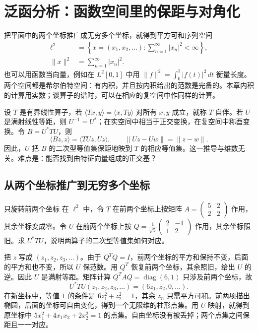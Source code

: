 \chapter{泛函分析：函数空间里的保距与对角化}
\label{chap:functional}

把平面中的两个坐标推广成无穷多个坐标，就得到平方可和序列空间
\begin{align*}
 \ell^2&=\left\{x=(x_1,x_2,\ldots):\sum_{n=1}^{\infty}|x_n|^2<\infty\right\},\\
 \|x\|^2&=\sum_{n=1}^{\infty}|x_n|^2.
\end{align*}
也可以用函数当向量，例如在 \(L^2[0,1]\) 中用 \(\|f\|^2=\int_0^1|f(t)|^2\,dt\) 衡量长度。两个空间都是希尔伯特空间：有内积，并且按内积给出的范数是完备的。本章内积的计算用实数；谈算子的谱时，可以在相应的复空间中作同样的计算。

设 \(T\) 是有界线性算子，若 \(\langle Tx,y\rangle=\langle x,Ty\rangle\) 对所有 \(x,y\) 成立，就称 \(T\) 自伴。若 \(U\) 是满射线性等距，则 \(U^{-1}=U^*\)；在实空间中相当于正交变换，在复空间中称酉变换。令 \(B=U^*TU\)，则
\[
 \langle Bz,z\rangle=\langle TUz,Uz\rangle,
 \qquad \|Uz-Uw\|=\|z-w\|.
\]
因此，\(U\) 把 \(B\) 的二次型等值集保距地映到 \(T\) 的相应等值集。这一推导与维数无关。难点是：能否找到由特征向量组成的正交基？

\section{从两个坐标推广到无穷多个坐标}

\begin{example}{只旋转前两个坐标}
在 \(\ell^2\) 中，令 \(T\) 在前两个坐标上按矩阵 \(A=\begin{pmatrix}5&2\\2&2\end{pmatrix}\) 作用，其余坐标变成零。令 \(U\) 在前两个坐标上按 \(Q=\frac1{\sqrt5}\begin{pmatrix}2&-1\\1&2\end{pmatrix}\) 作用，其余坐标照旧。求 \(U^*TU\)，说明两算子的二次型等值集如何对应。
\end{example}
\begin{solution}
把 \(z\) 写成 \((z_1,z_2,z_3,\ldots)\)。由于 \(Q^TQ=I\)，前两个坐标的平方和保持不变，后面的平方和也不变，所以 \(U\) 保范数。用 \(Q^T\) 恢复前两个坐标，其余照旧，给出 \(U\) 的逆。因此 \(U\) 是满射等距。矩阵计算 \(Q^TAQ=\operatorname{diag}(6,1)\) 只涉及前两个坐标，故
\[
 U^*TU(z_1,z_2,z_3,\ldots)=(6z_1,z_2,0,\ldots).
\]
在新坐标中，等值 \(1\) 的条件是 \(6z_1^2+z_2^2=1\)，其余 \(z_n\) 只需平方可和。前两项描出椭圆，后面的坐标可自由变化，得到一个无限维的柱形点集。用 \(U\) 映射，就得到原坐标中 \(5x_1^2+4x_1x_2+2x_2^2=1\) 的点集。自由坐标没有被丢掉；两个点集之间保距且一一对应。
\end{solution}

